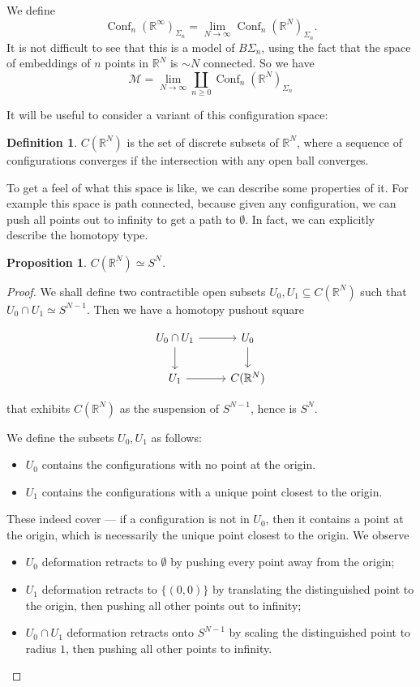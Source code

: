 \documentclass{shortart}
\newtheorem{prop}[lemma]{Proposition}
\theoremstyle{definition}
\newtheorem{defi}[lemma]{Definition}
\DeclareMathOperator\Conf{Conf}
\newcommand\R{\mathbb{R}}
\begin{document}
We define
\[
  \Conf_n(\R^\infty)_{\Sigma_n} = \lim_{N \to \infty} \Conf_n(\R^N)_{\Sigma_n}.
\]
It is not difficult to see that this is a model of $B \Sigma_n$, using the fact that the space of embeddings of $n$ points in $\R^N$ is $\sim N$ connected. So we have
\[
  \mathcal{M} = \lim_{N \to \infty} \coprod_{n \geq 0} \Conf_n(\R^N)_{\Sigma_n}
\]

It will be useful to consider a variant of this configuration space:
\begin{defi}
  $C(\R^N)$ is the set of discrete subsets of $\R^N$, where a sequence of configurations converges if the intersection with any open ball converges.
\end{defi}
To get a feel of what this space is like, we can describe some properties of it. For example this space is path connected, because given any configuration, we can push all points out to infinity to get a path to $\emptyset$. In fact, we can explicitly describe the homotopy type.

\begin{prop}
  $C(\R^N) \simeq S^N$.
\end{prop}

\begin{proof}
  We shall define two contractible open subsets $U_0, U_1 \subseteq C(\R^N)$ such that $U_0 \cap U_1 \simeq S^{N - 1}$. Then we have a homotopy pushout square
  \begin{useimager}
    \[
      \begin{tikzcd}
        U_0 \cap U_1 \ar[r] \ar[d] & U_0\ar[d]\\
        U_1 \ar[r] & C(\R^N)
      \end{tikzcd}
    \]
  \end{useimager}
  that exhibits $C(\R^N)$ as the suspension of $S^{N - 1}$, hence is $S^N$.

  We define the subsets $U_0, U_1$ as follows:
  \begin{itemize}
    \item $U_0$ contains the configurations with no point at the origin. 
    \item $U_1$ contains the configurations with a unique point closest to the origin.
  \end{itemize}
  These indeed cover --- if a configuration is not in $U_0$, then it contains a point at the origin, which is necessarily the unique point closest to the origin. We observe
  \begin{itemize}
    \item $U_0$ deformation retracts to $\emptyset$ by pushing every point away from the origin;
    \item $U_1$ deformation retracts to $\{(0, 0)\}$ by translating the distinguished point to the origin, then pushing all other points out to infinity;
    \item $U_0 \cap U_1$ deformation retracts onto $S^{N - 1}$ by scaling the distinguished point to radius $1$, then pushing all other points to infinity.\qedhere
  \end{itemize}
\end{proof}
\end{document}
